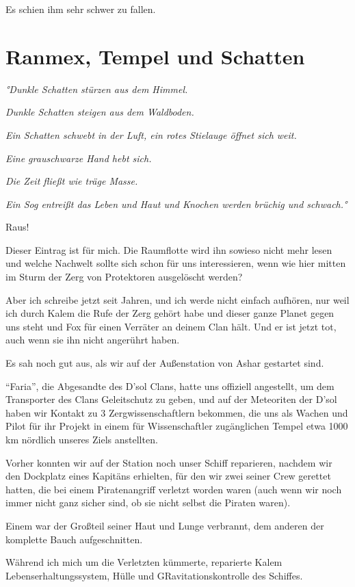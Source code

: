 \documentclass[11pt]{article}
\begin{document}
Es schien ihm sehr schwer zu fallen.

\section{Ranmex, Tempel und Schatten}

\emph{°Dunkle Schatten stürzen aus dem Himmel.}

\emph{Dunkle Schatten steigen aus dem Waldboden.}

\emph{Ein Schatten schwebt in der Luft, ein rotes Stielauge öffnet sich
weit.}

\emph{Eine grauschwarze Hand hebt sich.}

\emph{Die Zeit fließt wie träge Masse.}

\emph{Ein Sog entreißt das Leben und Haut und Knochen werden brüchig und
schwach.°}

Raus!

Dieser Eintrag ist für mich. Die Raumflotte wird ihn sowieso nicht mehr
lesen und welche Nachwelt sollte sich schon für uns interessieren, wenn
wie hier mitten im Sturm der Zerg von Protektoren ausgelöscht werden?

Aber ich schreibe jetzt seit Jahren, und ich werde nicht einfach
aufhören, nur weil ich durch Kalem die Rufe der Zerg gehört habe und
dieser ganze Planet gegen uns steht und Fox für einen Verräter an deinem
Clan hält. Und er ist jetzt tot, auch wenn sie ihn nicht angerührt
haben.

Es sah noch gut aus, als wir auf der Außenstation von Ashar gestartet
sind.

``Faria'', die Abgesandte des D'sol Clans, hatte uns offiziell
angestellt, um dem Transporter des Clans Geleitschutz zu geben, und auf
der Meteoriten der D'sol haben wir Kontakt zu 3 Zergwissenschaftlern
bekommen, die uns als Wachen und Pilot für ihr Projekt in einem für
Wissenschaftler zugänglichen Tempel etwa 1000 km nördlich unseres Ziels
anstellten.

Vorher konnten wir auf der Station noch unser Schiff reparieren, nachdem
wir den Dockplatz eines Kapitäns erhielten, für den wir zwei seiner Crew
gerettet hatten, die bei einem Piratenangriff verletzt worden waren
(auch wenn wir noch immer nicht ganz sicher sind, ob sie nicht selbst
die Piraten waren).

Einem war der Großteil seiner Haut und Lunge verbrannt, dem anderen der
komplette Bauch aufgeschnitten.

Während ich mich um die Verletzten kümmerte, reparierte Kalem
Lebenserhaltungssystem, Hülle und GRavitationskontrolle des Schiffes.
\end{document}

